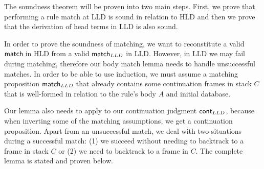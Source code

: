 The soundness theorem will be proven into two main steps. First, we prove that performing a rule match at LLD is sound in relation to HLD and
then we prove that the derivation of head terms in LLD is also sound.

In order to prove the soundness of matching, we want to reconstitute a valid $\mathsf{match} \;$in HLD from a valid $\mathsf{match}_{LLD} \;$in LLD. However, in LLD
we may fail during matching, therefore our body match lemma needs to handle unsuccessful matches. In order to be able to use induction, we
must assume a matching proposition $\mathsf{match}_{LLD} \;$that already contains some continuation frames in stack $C$ that is well-formed in relation to the rule's body $A$ and initial database.

Our lemma also needs to apply to our continuation judgment $\mathsf{cont}_{LLD}$, because when inverting some of
the matching assumptions, we get a continuation proposition. Apart from an unsuccessful match, we deal
with two situations during a successful match: (1) we succeed without needing to backtrack to a frame
in stack $C$ or (2) we need to backtrack to a frame in $C$. The complete lemma is stated and proven below.

